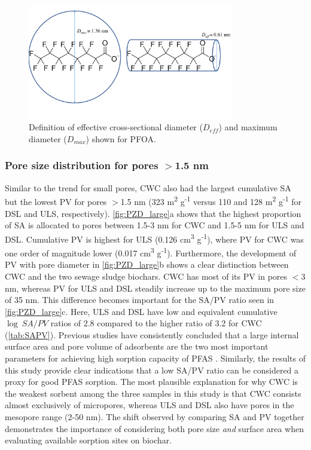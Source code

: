 \begin{figure}
    \centering
    \includegraphics[width=0.8\textwidth, trim={0 2cm 0 0},clip]{Diagrams/Molecular_size.pdf}
    \caption{Definition of effective cross-sectional diameter ($D_{eff}$) and maximum diameter ($D_{max}$) shown for PFOA.}
    \label{fig:molecularSize}
\end{figure}

\subsubsection{Pore size distribution for pores $>$1.5 nm}
Similar to the trend for small pores, CWC also had the largest cumulative SA but the lowest PV for pores $>$1.5 nm (323 m\textsuperscript{2} g\textsuperscript{-1} versus 110 and 128 m\textsuperscript{2} g\textsuperscript{-1} for DSL and ULS, respectively). \cref{fig:PZD_large}a shows that the highest proportion of SA is allocated to pores between 1.5-3 nm for CWC and 1.5-5 nm for ULS and DSL. Cumulative PV is highest for ULS (0.126 cm\textsuperscript{3} g\textsuperscript{-1}), where PV for CWC was one order of magnitude lower (0.017 cm\textsuperscript{3} g\textsuperscript{-1}). Furthermore, the development of PV with pore diameter in \cref{fig:PZD_large}b shows a clear distinction between CWC and the two sewage sludge biochars. CWC has most of its PV in pores $<$3 nm, whereas PV for ULS and DSL steadily increase up to the maximum pore size of 35 nm. This difference becomes important for the SA/PV ratio seen in \cref{fig:PZD_large}c. Here, ULS and DSL have low and equivalent cumulative $\log~SA/PV$ ratios of 2.8 compared to the higher ratio of 3.2 for CWC (\cref{tab:SAPV}). Previous studies have consistently concluded that a large internal surface area and pore volume of adsorbents are the two most important parameters for achieving high sorption capacity of PFAS \citep{du2014adsorption,Sormo2021,Hale2016,ahmed2020per}. Similarly, the results of this study provide clear indications that a low SA/PV ratio can be considered a proxy for good PFAS sorption. The most plausible explanation for why CWC is the weakest sorbent among the three samples in this study is that CWC consists almost exclusively of micropores, whereas ULS and DSL also have pores in the mesopore range (2-50 nm). The shift observed by comparing SA and PV together demonstrates the importance of considering both pore size \textit{and} surface area when evaluating available sorption sites on biochar.


